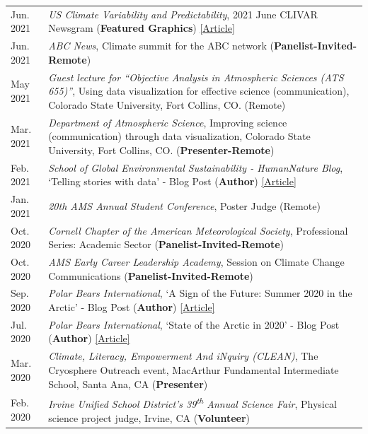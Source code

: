 \documentclass[margin,line,palatino,courier,10pt]{res}
\begin{document}
\begin{resume}
\begin{tabular}{@{}p{0.9in}p{4in}}
Jun. 2021 & \textit{US Climate Variability and Predictability}, 2021 June CLIVAR Newsgram (\textbf{Featured Graphics}) \href{https://mailchi.mp/usclivar/newsgram-2021june}{[Article]}\\
Jun. 2021 & \textit{ABC News}, Climate summit for the ABC network (\textbf{Panelist-Invited-Remote})\\
May 2021 & \textit{Guest lecture for ``Objective Analysis in Atmospheric Sciences (ATS 655)''}, Using data visualization for effective science (communication), Colorado State University, Fort Collins, CO. (Remote)\\
Mar. 2021 & \textit{Department of Atmospheric Science}, Improving science (communication) through data visualization, Colorado State University, Fort Collins, CO. (\textbf{Presenter-Remote})\\
Feb. 2021 & \textit{School of Global Environmental Sustainability - HumanNature Blog}, `Telling stories with data' - Blog Post (\textbf{Author}) \href{https://sustainability.colostate.edu/blog/humannature/zachary-labe/}{[Article]}\\
Jan. 2021 & \textit{20th AMS Annual Student Conference}, Poster Judge (Remote)\\
Oct. 2020 & \textit{Cornell Chapter of the American Meteorological Society}, Professional Series: Academic Sector (\textbf{Panelist-Invited-Remote})\\
Oct. 2020 & \textit{AMS Early Career Leadership Academy}, Session on Climate Change Communications (\textbf{Panelist-Invited-Remote})\\
Sep. 2020 & \textit{Polar Bears International}, `A Sign of the Future: Summer 2020 in the Arctic' - Blog Post (\textbf{Author}) \href{https://polarbearsinternational.org/news/article-climate-change/a-sign-of-the-future-summer-2020-in-the-arctic/}{[Article]}\\
Jul. 2020 & \textit{Polar Bears International}, `State of the Arctic in 2020' - Blog Post (\textbf{Author}) \href{https://polarbearsinternational.org/news/article-climate-change/state-of-the-arctic-in-2020/}{[Article]}\\
Mar. 2020 &\textit{Climate, Literacy, Empowerment And iNquiry (CLEAN)}, The Cryosphere Outreach event, MacArthur Fundamental Intermediate School, Santa Ana, CA (\textbf{Presenter})\\
Feb. 2020 & \textit{Irvine Unified School District's 39\textsuperscript{th} Annual Science Fair}, Physical science project judge, Irvine, CA (\textbf{Volunteer})\\

\end{tabular}
\end{resume}
\end{document}
